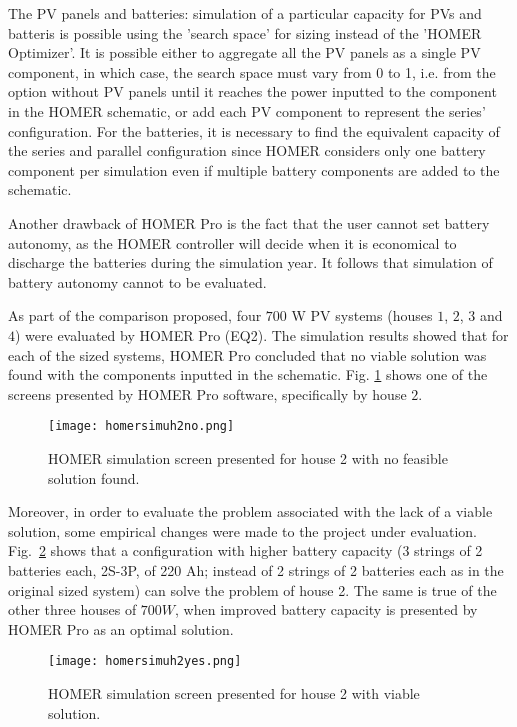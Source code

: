 The PV panels and batteries: simulation of a particular capacity for PVs and batteris is possible using the 'search space' for sizing instead of the 'HOMER Optimizer'. It is possible either to aggregate all the PV panels as a single PV component, in which case, the search space must vary from 0 to 1, i.e. from the option without PV panels until it reaches the power inputted to the component in the HOMER schematic, or add each PV component to represent the series' configuration. For the batteries, it is necessary to find the equivalent capacity of the series and parallel configuration since HOMER considers only one battery component per simulation even if multiple battery components are added to the schematic.

Another drawback of HOMER Pro is the fact that the user cannot set battery autonomy, as the HOMER controller will decide when it is economical to discharge the batteries during the simulation year. It follows that simulation of battery autonomy cannot to be evaluated.

As part of the comparison proposed, four $700$ W PV systems (houses $1$, $2$, $3$ and $4$) were evaluated by HOMER Pro (EQ2). The simulation results showed that for each of the sized systems, HOMER Pro concluded that no viable solution was found with the components inputted in the schematic. Fig. \ref{fig:homersimuh2no} shows one of the screens presented by HOMER Pro software, specifically by house $2$.

\begin{figure}[h]
\texttt{[image: homersimuh2no.png]}
\centering
\caption{HOMER simulation screen presented for house 2 with no feasible solution found.}
\label{fig:homersimuh2no}
\end{figure}

Moreover, in order to evaluate the problem associated with the lack of a viable solution, some empirical changes were made to the  project under evaluation. Fig.~\ref{fig:homersimuh2yes} shows that a configuration with higher battery capacity (3 strings of 2 batteries each, 2S-3P, of 220 Ah; instead of 2 strings of 2 batteries each as in the original sized system) can solve the problem of house 2. The same is true of the other three houses of $700 W$, when improved battery capacity is presented by HOMER Pro as an optimal solution.

\begin{figure}[h]
\texttt{[image: homersimuh2yes.png]}
\centering
\caption{HOMER simulation screen presented for house 2 with viable solution.}
\label{fig:homersimuh2yes}
\end{figure}


